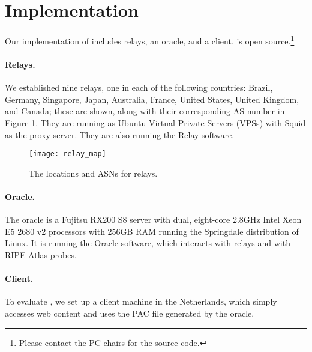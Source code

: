 \section{Implementation}

Our implementation of \system{} includes relays, an oracle, and 
a client. \system{} is open source.\footnote{Please
  contact the PC chairs for the source code.}

\paragraph{Relays.}  We established nine relays, one in each of the following countries: Brazil, 
Germany, Singapore, Japan, Australia, France, United States, United Kingdom, and Canada; these 
are shown, along with their corresponding AS number in Figure \ref{fig:relay_locations}.  
They are running as Ubuntu Virtual Private Servers (VPSs) with 
Squid as the proxy server.  They are also running the \system{} Relay software.

\begin{figure}[t!]
\centering
\texttt{[image: relay\_map]}
\caption{The locations and ASNs for \system{} relays.}
\label{fig:relay_locations}
\end{figure}

\paragraph{Oracle.}  The oracle is a Fujitsu RX200 S8 server with dual, 
eight-core 2.8GHz Intel Xeon E5 2680 v2 processors with 256GB RAM running the 
Springdale distribution of Linux. It is running the \system{} Oracle software, 
which interacts with relays and with RIPE Atlas probes.

\paragraph{Client.} To evaluate \system{}, we set up a client 
machine in the Netherlands, which simply accesses web content and uses the PAC 
file generated by the oracle. 
